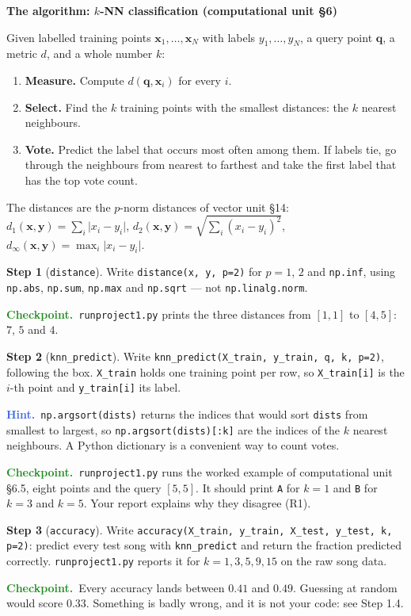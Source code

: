\documentclass[11pt]{article}
\theoremstyle{definition}
\newtheorem{step}{Step}[section]
\newcommand{\hint}[1]{\par\smallskip\noindent
  {\small\sffamily\textcolor{RoyalBlue}{\textbf{Hint.}}\ #1}\par\smallskip}
\newcommand{\checkpoint}[1]{\par\smallskip\noindent
  {\small\sffamily\textcolor{ForestGreen}{\textbf{Checkpoint.}}\ #1}\par\smallskip}
\newenvironment{callout}[1]
  {\par\medskip\needspace{5\baselineskip}%
   \begin{lrbox}{\qcbox}%
   \begin{minipage}{\dimexpr\textwidth-2\fboxsep-4pt}%
   \setlength{\parskip}{0.4em}%
   \textbf{\sffamily\color{RoyalBlue}#1}\par}
  {\end{minipage}\end{lrbox}%
   \begin{center}\colorbox{softbg}{\usebox{\qcbox}}\end{center}\medskip}
\newcommand{\vc}[1]{\mathbf{#1}}
\newcommand{\file}[1]{\texttt{#1}}
\begin{document}
\begin{callout}{The algorithm: $k$-NN classification (computational unit \S6)}
Given labelled training points $\vc{x}_1,\dots,\vc{x}_N$ with labels
$y_1,\dots,y_N$, a query point $\vc{q}$, a metric $d$, and a whole number $k$:
\begin{enumerate}[label=\textbf{\arabic*.},leftmargin=2em,itemsep=2pt,topsep=2pt]
  \item \textbf{Measure.} Compute $d(\vc{q},\vc{x}_i)$ for every $i$.
  \item \textbf{Select.} Find the $k$ training points with the smallest
        distances: the $k$ nearest neighbours.
  \item \textbf{Vote.} Predict the label that occurs most often among them.
        If labels tie, go through the neighbours from nearest to farthest and
        take the first label that has the top vote count.
\end{enumerate}
The distances are the $p$-norm distances of vector unit \S14:
$d_1(\vc{x},\vc{y})=\sum_i\lvert x_i-y_i\rvert$,
$d_2(\vc{x},\vc{y})=\sqrt{\sum_i(x_i-y_i)^{2}}$,
$d_\infty(\vc{x},\vc{y})=\max_i\lvert x_i-y_i\rvert$.
\end{callout}

\begin{step}[\texttt{distance}]
Write \texttt{distance(x, y, p=2)} for $p=1$, $2$ and \texttt{np.inf}, using
\texttt{np.abs}, \texttt{np.sum}, \texttt{np.max} and \texttt{np.sqrt} ---
not \texttt{np.linalg.norm}.
\checkpoint{\file{runproject1.py} prints the three distances from $[1,1]$ to $[4,5]$: $7$,
$5$ and $4$.}
\end{step}

\begin{step}[\texttt{knn\_predict}]
Write \texttt{knn\_predict(X\_train, y\_train, q, k, p=2)}, following the box.
\texttt{X\_train} holds one training point per row, so \texttt{X\_train[i]} is
the $i$-th point and \texttt{y\_train[i]} its label.
\hint{\texttt{np.argsort(dists)} returns the indices that would sort
\texttt{dists} from smallest to largest, so \texttt{np.argsort(dists)[:k]} are
the indices of the $k$ nearest neighbours. A Python dictionary is a
convenient way to count votes.}
\checkpoint{\file{runproject1.py} runs the worked example of computational unit \S6.5,
eight points and the query $[5,5]$. It should print \texttt{A} for $k=1$ and
\texttt{B} for $k=3$ and $k=5$. Your report explains why they disagree (R1).}
\end{step}

\begin{step}[\texttt{accuracy}]
Write \texttt{accuracy(X\_train, y\_train, X\_test, y\_test, k, p=2)}: predict
every test song with \texttt{knn\_predict} and return the fraction predicted
correctly. \file{runproject1.py} reports it for $k=1,3,5,9,15$ on the raw song data.
\checkpoint{Every accuracy lands between $0.41$ and $0.49$. Guessing at random
would score $0.33$. Something is badly wrong, and it is not your code: see
Step 1.4.}
\end{step}
\end{document}
